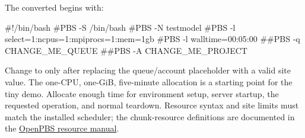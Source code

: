 \documentclass[
  11pt,
  a4paper,
]{article}
\newenvironment{Shaded}{}{}
\newcommand{\CommentTok}[1]{\textcolor[rgb]{0.38,0.63,0.69}{\textit{#1}}}
\DeclareRobustCommand{\InlineCode}[1]{{\ttfamily\upshape\seqsplit{#1}}}
\renewenvironment{Shaded}{\begin{snugshade}}{\end{snugshade}}
\renewcommand{\CommentTok}[1]{\textcolor[rgb]{0.38,0.63,0.69}{#1}}
\begin{document}
The converted \href{pbs_scripts/job.sh}{\InlineCode{job.sh}} begins
with:


\begin{Shaded}
\begin{Highlighting}[]
\CommentTok{\#!/bin/bash}
\CommentTok{\#PBS {-}S /bin/bash}
\CommentTok{\#PBS {-}N testmodel}
\CommentTok{\#PBS {-}l select=1:ncpus=1:mpiprocs=1:mem=1gb}
\CommentTok{\#PBS {-}l walltime=00:05:00}
\CommentTok{\#\#PBS {-}q CHANGE\_ME\_QUEUE}
\CommentTok{\#\#PBS {-}A CHANGE\_ME\_PROJECT}
\end{Highlighting}
\end{Shaded}

Change \InlineCode{\#\#PBS} to \InlineCode{\#PBS} only after replacing
the queue/account placeholder with a valid site value. The one-CPU,
one-GiB, five-minute allocation is a starting point for the tiny demo.
Allocate enough time for environment setup, server startup, the
requested operation, and normal teardown. Resource syntax and site
limits must match the installed scheduler; the chunk-resource
definitions are documented in the
\href{https://github.com/openpbs/openpbs/blob/master/doc/man1/pbs_resources.7B}{OpenPBS
resource manual}.
\end{document}
